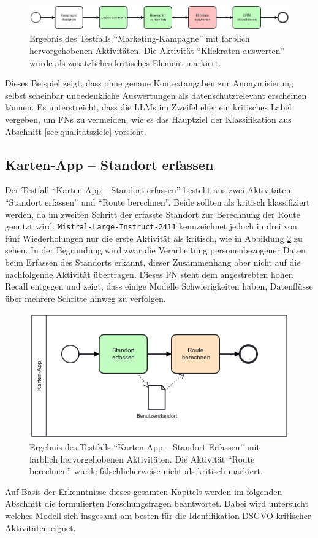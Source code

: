 \begin{figure}
    \centering
    \includegraphics[width=\textwidth]{images/results/examples/oss-20b-run-1-small-marketing}
    \caption{Ergebnis des Testfalls \enquote{Marketing-Kampagne} mit farblich hervorgehobenen Aktivitäten. Die Aktivität \enquote{Klickraten auswerten} wurde als zusätzliches kritisches Element markiert.}
    \label{fig:gptoss-fall}
\end{figure}

Dieses Beispiel zeigt, dass ohne genaue Kontextangaben zur Anonymisierung selbst scheinbar unbedenkliche Auswertungen als datenschutzrelevant erscheinen können. Es unterstreicht, dass die \acp{LLM} im Zweifel eher ein kritisches Label vergeben, um \acp{FN} zu vermeiden, wie es das Hauptziel der Klassifikation aus Abschnitt \ref{sec:qualitatsziele} vorsieht.

\subsection*{Karten-App – Standort erfassen}

Der Testfall \enquote{Karten-App – Standort erfassen} besteht aus zwei Aktivitäten: \enquote{Standort erfassen} und \enquote{Route berechnen}. Beide sollten als kritisch klassifiziert werden, da im zweiten Schritt der erfasste Standort zur Berechnung der Route genutzt wird. \texttt{Mistral-Large-Instruct-2411} kennzeichnet jedoch in drei von fünf Wiederholungen nur die erste Aktivität als kritisch, wie in Abbildung \ref{fig:mistral-fall} zu sehen. In der Begründung wird zwar die Verarbeitung personenbezogener Daten beim Erfassen des Standorts erkannt, dieser Zusammenhang aber nicht auf die nachfolgende Aktivität übertragen. Dieses \ac{FN} steht dem angestrebten hohen Recall entgegen und zeigt, dass einige Modelle Schwierigkeiten haben, Datenflüsse über mehrere Schritte hinweg zu verfolgen.

\begin{figure}
    \centering
    \includegraphics[width=.55\textwidth]{images/results/examples/mistral-large-run-3-small-maps-app}
    \caption{Ergebnis des Testfalls \enquote{Karten-App – Standort Erfassen} mit farblich hervorgehobenen Aktivitäten. Die Aktivität \enquote{Route berechnen} wurde fälschlicherweise nicht als kritisch markiert.}
    \label{fig:mistral-fall}
\end{figure}

Auf Basis der Erkenntnisse dieses gesamten Kapitels werden im folgenden Abschnitt die formulierten Forschungsfragen beantwortet. Dabei wird untersucht welches Modell sich insgesamt am besten für die Identifikation \ac{DSGVO}‑kritischer Aktivitäten eignet.